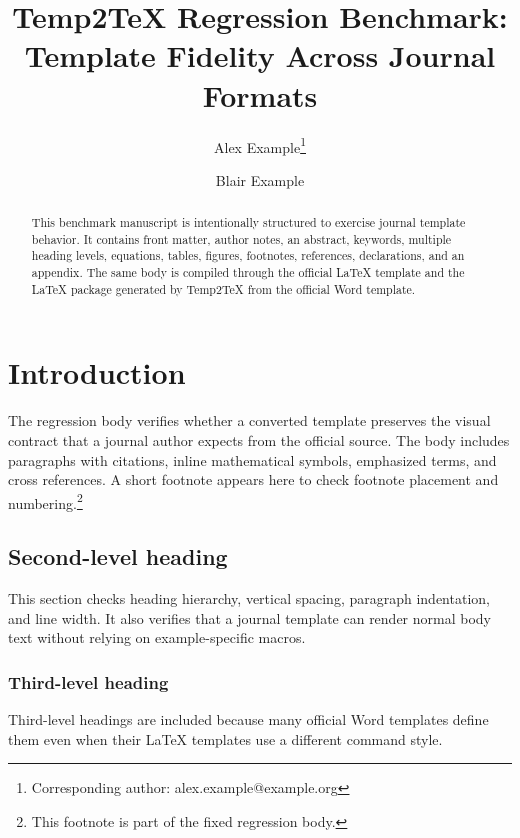 \title{Temp2TeX Regression Benchmark: Template Fidelity Across Journal Formats}
\author{Alex Example\thanks{Corresponding author: alex.example@example.org} \and Blair Example}
\date{}
\maketitle

\tempTwoTexAbstractBegin
\begin{abstract}
This benchmark manuscript is intentionally structured to exercise journal template behavior. It contains front matter, author notes, an abstract, keywords, multiple heading levels, equations, tables, figures, footnotes, references, declarations, and an appendix. The same body is compiled through the official LaTeX template and the LaTeX package generated by Temp2TeX from the official Word template.
\end{abstract}
\tempTwoTexAbstractEnd


\tempTwoTexBodyBegin
\section{Introduction}
The regression body verifies whether a converted template preserves the visual contract that a journal author expects from the official source. The body includes paragraphs with citations, inline mathematical symbols, emphasized terms, and cross references. A short footnote appears here to check footnote placement and numbering.\footnote{This footnote is part of the fixed regression body.}

\subsection{Second-level heading}
This section checks heading hierarchy, vertical spacing, paragraph indentation, and line width. It also verifies that a journal template can render normal body text without relying on example-specific macros.

\subsubsection{Third-level heading}
Third-level headings are included because many official Word templates define them even when their LaTeX templates use a different command style.

